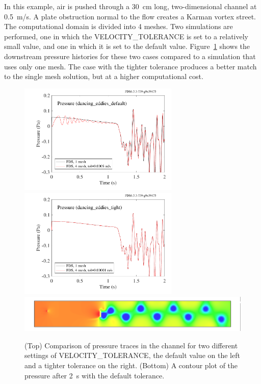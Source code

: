 \documentclass[11pt]{book}
\begin{document}
In this example, air is pushed through a 30~cm long, two-dimensional channel at 0.5~m/s. A plate obstruction normal to the flow creates a Karman vortex street. The computational domain is divided into 4 meshes. Two simulations are performed, one in which the {\ct VELOCITY\_TOLERANCE} is set to a relatively small value, and one in which it is set to the default value. Figure~\ref{dancing_eddies} shows the downstream pressure histories for these two cases compared to a simulation that uses only one mesh. The case with the tighter tolerance produces a better match to the single mesh solution, but at a higher computational cost.

\begin{figure}[ht]
\begin{center}
\includegraphics[width=3in]{SCRIPT_FIGURES/dancing_eddies_default}
\includegraphics[width=3in]{SCRIPT_FIGURES/dancing_eddies_tight}
\includegraphics[width=\textwidth]{SCRIPT_FIGURES/dancing_eddies}
\end{center}
\caption[Results of the {\ct dancing\_eddies} test cases]{(Top) Comparison of pressure traces in the channel for two different settings
of {\ct VELOCITY\_TOLERANCE}, the default value on the left and a tighter tolerance on the right. (Bottom) A contour plot of the pressure after 2~s with the default tolerance.}
\label{dancing_eddies}
\end{figure}
\end{document}
